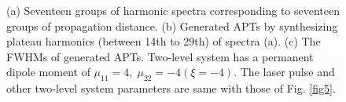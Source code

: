 \documentclass[10pt,letterpaper]{article}
\begin{document}
\begin{figure}[!htbp]
\centering
	\hspace{-0.6in}
\caption{(a) Seventeen groups of harmonic spectra corresponding to seventeen groups of propagation distance. (b) Generated APTs by synthesizing plateau harmonics (between 14th to 29th) of spectra (a). (c) The FWHMs of generated APTs. Two-level system has a permanent dipole moment of $\mu_{11}=4,\;\mu_{22}=-4(\xi=-4)$. The laser pulse and other two-level system parameters are same with those of Fig. \ref{fig5}.}
\label{fig6}
\end{figure}
\end{document}
